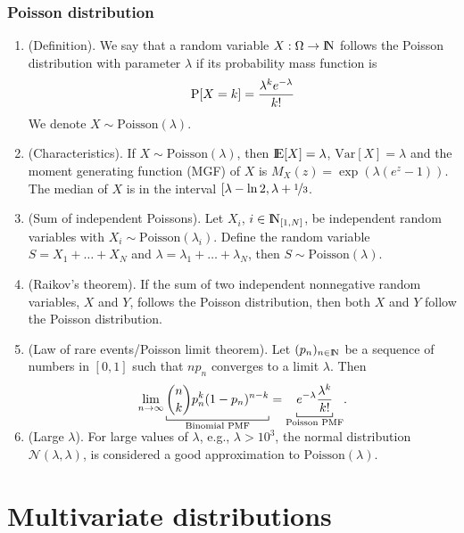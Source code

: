 \documentclass[a4paper,10pt]{scrbook}
\begin{document}
\subsection{Poisson distribution}
\begin{enumerate}
 \item (Definition). We say that a random variable \(X:\Omega\to\N\) follows the Poisson distribution
       with parameter \(\lambda\) if its probability mass function is
       \[
        \mathrm{P}[X = k] = \frac{\lambda^k e^{-\lambda}}{k!}
       \]
       We denote \(X\sim\mathrm{Poisson}(\lambda)\).
 \item (Characteristics). If \(X\sim\mathrm{Poisson}(\lambda)\), then \(\E[X]=\lambda\), 
       \(\mathrm{Var}[X]=\lambda\) and the moment generating function (MGF) of \(X\) is 
        \(M_X(z) = \exp(\lambda (e^z - 1))\). The median of \(X\) is in the interval 
        \([\lambda - \ln 2, \lambda + \nicefrac{1}{3}\).
        
 \item (Sum of independent Poissons). Let \(X_i\), \(i\in\N_{[1,N]}\), be independent random 
       variables with \(X_i\sim\mathrm{Poisson}(\lambda_i)\). Define the random variable 
       \(S = X_1 + \ldots + X_N\) and \(\lambda = \lambda_1 + \ldots + \lambda_N\), then
       \(S \sim \mathrm{Poisson}(\lambda)\).
       
 \item (Raikov's theorem). If the sum of two independent nonnegative random variables, 
       \(X\) and \(Y\), follows the Poisson distribution, then both \(X\) and \(Y\)
       follow the Poisson distribution.
       
 \item (Law of rare events/Poisson limit theorem). Let \((p_n)_{n\in\N}\) be a sequence of 
       numbers in \([0,1]\) such that \(np_n\) converges to a limit \(\lambda\). Then
       \[
        \lim_{n\to\infty}\smashunderbracket{{n \choose k} p_n^k (1-p_n)^{n-k}}{\text{Binomial PMF}} 
        =
        \smashunderbracket{e^{-\lambda}\frac{\lambda^k}{k!}}{\text{Poisson PMF}}.
       \]
 \item (Large \(\lambda\)). For large values of \(\lambda\), e.g., \(\lambda>10^3\), the 
       normal distribution \(\mathcal{N}(\lambda, \lambda)\), is considered 
       a good approximation to \(\mathrm{Poisson}(\lambda)\).

\end{enumerate}

\chapter{Multivariate distributions}
\end{document}
